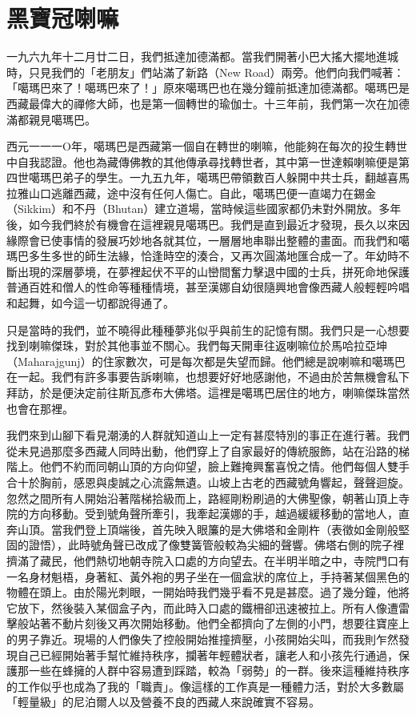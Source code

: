 \chapter{黑寶冠喇嘛}

一九六九年十二月廿二日，我們抵達加德滿都。當我們開著小巴大搖大擺地進城時，只見我們的「老朋友」們站滿了新路（New
Road）兩旁。他們向我們喊著：「噶瑪巴來了！噶瑪巴來了！」原來噶瑪巴也在幾分鐘前抵達加德滿都。噶瑪巴是西藏最偉大的禪修大師，也是第一個轉世的瑜伽士。十三年前，我們第一次在加德滿都親見噶瑪巴。

西元一一一Ο年，噶瑪巴是西藏第一個自在轉世的喇嘛，他能夠在每次的投生轉世中自我認證。他也為藏傳佛教的其他傳承尋找轉世者，其中第一世達賴喇嘛便是第四世噶瑪巴弟子的學生。一九五九年，噶瑪巴帶領數百人躲開中共士兵，翻越喜馬拉雅山口逃離西藏，途中沒有任何人傷亡。自此，噶瑪巴便一直竭力在錫金（Sikkim）和不丹（Bhutan）建立道場，當時候這些國家都仍未對外開放。多年後，如今我們終於有機會在這裡親見噶瑪巴。我們是直到最近才發現，長久以來因緣際會已使事情的發展巧妙地各就其位，一層層地串聯出整體的畫面。而我們和噶瑪巴多生多世的師生法緣，恰逢時空的湊合，又再次圓滿地匯合成一了。年幼時不斷出現的深層夢境，在夢裡起伏不平的山巒間奮力擊退中國的士兵，拼死命地保護普通百姓和僧人的性命等種種情境，甚至漢娜自幼很隨興地會像西藏人般輕輕吟唱和起舞，如今這一切都說得通了。


只是當時的我們，並不曉得此種種夢兆似乎與前生的記憶有關。我們只是一心想要找到喇嘛傑珠，對於其他事並不關心。我們每天開車往返喇嘛位於馬哈拉亞坤（Maharajgunj）的住家數次，可是每次都是失望而歸。他們總是說喇嘛和噶瑪巴在一起。我們有許多事要告訴喇嘛，也想要好好地感謝他，不過由於苦無機會私下拜訪，於是便決定前往斯瓦彥布大佛塔。這裡是噶瑪巴居住的地方，喇嘛傑珠當然也會在那裡。

我們來到山腳下看見潮湧的人群就知道山上一定有甚麼特別的事正在進行著。我們從未見過那麼多西藏人同時出動，他們穿上了自家最好的傳統服飾，站在沿路的梯階上。他們不約而同朝山頂的方向仰望，臉上難掩興奮喜悅之情。他們每個人雙手合十於胸前，感恩與虔誠之心流露無遺。山坡上古老的西藏號角響起，聲聲迴旋。忽然之間所有人開始沿著階梯拾級而上，路經剛粉刷過的大佛聖像，朝著山頂上寺院的方向移動。受到號角聲所牽引，我牽起漢娜的手，越過緩緩移動的當地人，直奔山頂。當我們登上頂端後，首先映入眼簾的是大佛塔和金剛杵（表徵如金剛般堅固的證悟），此時號角聲已改成了像雙簧管般較為尖細的聲響。佛塔右側的院子裡擠滿了藏民，他們熱切地朝寺院入口處的方向望去。在半明半暗之中，寺院門口有一名身材魁梧，身著紅、黃外袍的男子坐在一個盒狀的席位上，手持著某個黑色的物體在頭上。由於陽光刺眼，一開始時我們幾乎看不見是甚麼。過了幾分鐘，他將它放下，然後裝入某個盒子內，而此時入口處的鐵柵卻迅速被拉上。所有人像遭雷擊般站著不動片刻後又再次開始移動。他們全都擠向了左側的小門，想要往寶座上的男子靠近。現場的人們像失了控般開始推撞擠壓，小孩開始尖叫，而我則乍然發現自己已經開始著手幫忙維持秩序，攔著年輕體狀者，讓老人和小孩先行通過，保護那一些在蜂擁的人群中容易遭到踩踏，較為「弱勢」的一群。後來這種維持秩序的工作似乎也成為了我的「職責」。像這樣的工作真是一種體力活，對於大多數屬「輕量級」的尼泊爾人以及營養不良的西藏人來說確實不容易。

